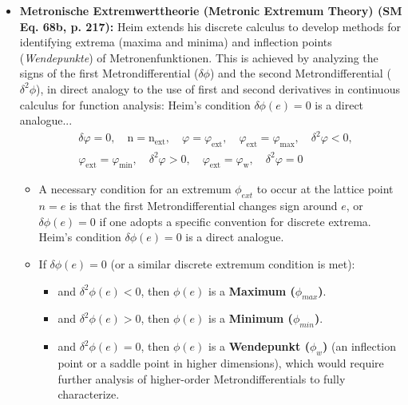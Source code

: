 \documentclass[12pt]{article}
\newcommand{\metrondifferential}{\delta}
\newcommand{\metronenziffer}{n}
\begin{document}
\begin{itemize}
    \item \textbf{Metronische Extremwerttheorie (Metronic Extremum Theory) (SM Eq. 68b, p. 217):}
    Heim extends his discrete calculus to develop methods for identifying extrema (maxima and minima) and inflection points (\textit{Wendepunkte}) of Metronenfunktionen. This is achieved by analyzing the signs of the first Metrondifferential (\( \metrondifferential\phi \)) and the second Metrondifferential (\( \metrondifferential^2\phi \)), in direct analogy to the use of first and second derivatives in continuous calculus for function analysis:
    Heim's condition $\delta\phi(e) = 0$ is a direct analogue...
    \begin{equation}
    \begin{aligned}
    & \delta\varphi = 0, \quad \mathrm{n} = \mathrm{n}_{\mathrm{ext}}, \quad \varphi = \varphi_{\mathrm{ext}}, \quad \varphi_{\mathrm{ext}} = \varphi_{\mathrm{max}}, \quad \delta^2\varphi < 0, \\
    & \varphi_{\mathrm{ext}} = \varphi_{\mathrm{min}}, \quad \delta^2\varphi > 0, \quad \varphi_{\mathrm{ext}} = \varphi_{\mathrm{w}}, \quad \delta^2\varphi = 0
    \end{aligned} \tag{68b}
    \end{equation}
    \begin{itemize}
        \item A necessary condition for an extremum \( \phi_{ext} \) to occur at the lattice point \( \metronenziffer=e \) is that the first Metrondifferential changes sign around \(e\), or \( \metrondifferential\phi(e) = 0 \) if one adopts a specific convention for discrete extrema. Heim's condition \( \metrondifferential\phi(e) = 0 \) is a direct analogue.
        \item If \( \metrondifferential\phi(e) = 0 \) (or a similar discrete extremum condition is met):
        \begin{itemize}
            \item and \( \metrondifferential^2\phi(e) < 0 \), then \( \phi(e) \) is a \textbf{Maximum (\( \phi_{max} \))}.
            \item and \( \metrondifferential^2\phi(e) > 0 \), then \( \phi(e) \) is a \textbf{Minimum (\( \phi_{min} \))}.
            \item and \( \metrondifferential^2\phi(e) = 0 \), then \( \phi(e) \) is a \textbf{Wendepunkt (\( \phi_w \))} (an inflection point or a saddle point in higher dimensions), which would require further analysis of higher-order Metrondifferentials to fully characterize.
        \end{itemize}
    \end{itemize}
\end{itemize}
\end{document}

